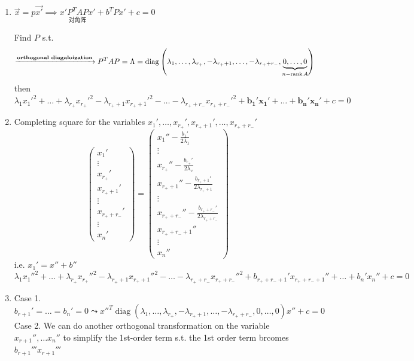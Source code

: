\begin{enumerate}[label={Step \arabic*.}]
    \item $\overrightarrow{x}=p\overrightarrow{x'}\implies x'\underset{\text{对角阵}}{P^TAP}x'+b^TPx'+c=0$

          Find $P$ s.t.$$\xrightarrow{\text{\textbf{orthogonal diagaloization}}}P^TAP=\Lambda=\operatorname{diag}\left(\lambda_1,\dots,\lambda_{r_+},-\lambda_{r_++1},\dots,-\lambda_{r_++r_-},\underbrace{0,\dots,0}_{n-\operatorname{rank}A}\right)$$
          then $\lambda_1x_1'^2+\dots+\lambda_{r_+}x_{r_+}'^2-\lambda_{r_++1}x_{r_++1}'^2-\dots-\lambda_{r_++r_-}x_{r_++r_-}'^2+\mathbf{b_1'x_1'+\dots+b_n'x_n'}+c=0$
    \item Completing square for the variables $x_1',\dots,x_{r_+}',x_{r_++1}',\dots,x_{r_++r_-}'$
          $$\begin{pmatrix}
                  x_1'         \\
                  \vdots       \\
                  x_{r_+}'     \\
                  x_{r_++1}'   \\
                  \vdots       \\
                  x_{r_++r_-}' \\
                  \vdots       \\
                  x_n'
              \end{pmatrix}=\begin{pmatrix}
                  x_1''-\frac{b_1'}{2\lambda_1}                         \\
                  \vdots                                                \\
                  x_{r_+}''-\frac{b_{r_+}'}{2\lambda_v}                 \\
                  x_{r_++1}''-\frac{b_{r_++1}'}{2\lambda_{r_++1}}       \\
                  \vdots                                                \\
                  x_{r_++r_-}''-\frac{b_{r_++r_-}'}{2\lambda_{r_++r_-}} \\
                  x_{r_++r_-+1}''                                       \\
                  \vdots                                                \\
                  x_n''
              \end{pmatrix}$$
          i.e. $x_1'=x''+b''$
          $$\lambda_1x_1''^2+\dots+\lambda_{r_+}x_{r_+}''^2-\lambda_{r_++1}x_{r_++1}''^2-\dots-\lambda_{r_++r_-}x_{r_++r_-}''^2+b_{r_++r_-+1}'x_{r_++r_-+1}''+\dots+b_n'x_n''+c=0$$
    \item Case 1.$$b_{r+1}'=\dots=b_n'=0\leadsto x''^T\operatorname{diag}\left(\lambda_1,\dots,\lambda_{r_+},-\lambda_{r_++1},\dots,-\lambda_{r_++r_-},0,\dots,0\right)x''+c=0$$
          Case 2. We can do another orthogonal transformation on the variable $x_{r+1}'',\dots x_n''$ to simplify the 1st-order term s.t. the 1st order term brcomes $b_{r+1}'''x_{r+1}'''$
\end{enumerate}

